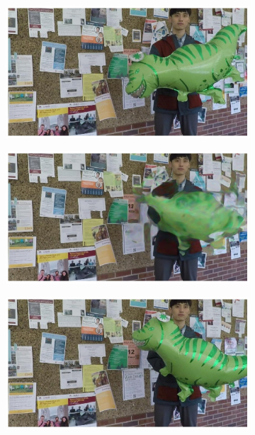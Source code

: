 \documentclass{article}
\begin{document}
\begin{figure}
\centering
\begin{subfigure}{0.33\textwidth}
	\centering
    \includegraphics[width=1\linewidth]{nd_scene/Balloon1_I0.jpg}
\end{subfigure}%
\begin{subfigure}{0.33\textwidth}
	\centering
    \includegraphics[width=1\linewidth]{nd_scene/Balloon1_out.jpg}
\end{subfigure}%
\begin{subfigure}{0.33\textwidth}
	\centering
    \includegraphics[width=1\linewidth]{nd_scene/Balloon1_I1.jpg}

\end{subfigure}
\end{figure}
\end{document}
